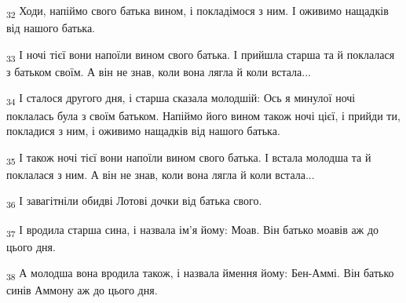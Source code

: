 \begin{tcolorbox}
\textsubscript{32} Ходи, напіймо свого батька вином, і покладімося з ним. І оживимо нащадків від нашого батька.
\end{tcolorbox}
\begin{tcolorbox}
\textsubscript{33} І ночі тієї вони напоїли вином свого батька. І прийшла старша та й поклалася з батьком своїм. А він не знав, коли вона лягла й коли встала...
\end{tcolorbox}
\begin{tcolorbox}
\textsubscript{34} І сталося другого дня, і старша сказала молодшій: Ось я минулої ночі поклалась була з своїм батьком. Напіймо його вином також ночі цієї, і прийди ти, покладися з ним, і оживимо нащадків від нашого батька.
\end{tcolorbox}
\begin{tcolorbox}
\textsubscript{35} І також ночі тієї вони напоїли вином свого батька. І встала молодша та й поклалася з ним. А він не знав, коли вона лягла й коли встала...
\end{tcolorbox}
\begin{tcolorbox}
\textsubscript{36} І завагітніли обидві Лотові дочки від батька свого.
\end{tcolorbox}
\begin{tcolorbox}
\textsubscript{37} І вродила старша сина, і назвала ім'я йому: Моав. Він батько моавів аж до цього дня.
\end{tcolorbox}
\begin{tcolorbox}
\textsubscript{38} А молодша вона вродила також, і назвала ймення йому: Бен-Аммі. Він батько синів Аммону аж до цього дня.
\end{tcolorbox}
